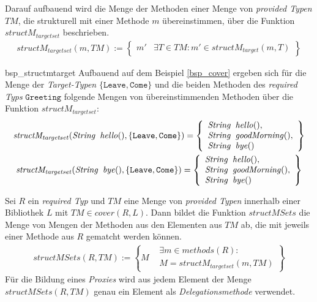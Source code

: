 \noindent
Darauf aufbauend wird die Menge der Methoden einer Menge von \emph{provided Typen} $\mathit{TM}$, die strukturell mit einer Methode $m$ übereinstimmen, über die Funktion $\mathit{structM_{targetset}}$ beschrieben.
\begin{gather*}
\mathit{structM_{targetset}(m, \mathit{TM})} := 
\left\{\begin{array}{l|l}
m'	& \exists T \in \mathit{TM}: m' \in \mathit{structM_{target}(m,T)}
\end{array}
\right\}
\end{gather*}
\begin{example}{bsp_structmtarget}
Aufbauend auf dem Beispiel \ref{bsp_cover} ergeben sich für die Menge der \emph{Target-Typen}  $\{\texttt{Leave}, \texttt{Come}\}$ und die beiden Methoden des \emph{required Typs} $\texttt{Greeting}$ folgende Mengen von übereinstimmenden Methoden über die Funktion $\mathit{structM_{targetset}}$:
\begin{gather*}
\mathit{structM_{targetset}(\mathit{String}\texttt{ }\mathit{hello()},\{\texttt{Leave}, \texttt{Come}\})} = 
\left\{
\begin{array}{l}
\mathit{String}\texttt{ }\mathit{hello()},\\
\mathit{String}\texttt{ }\mathit{goodMorning()},\\
\mathit{String}\texttt{ }\mathit{bye()}
\end{array}
\right\}\\
\mathit{structM_{targetset}(\mathit{String}\texttt{ }\mathit{bye()},\{\texttt{Leave}, \texttt{Come}\})} = 
\left\{
\begin{array}{l}
\mathit{String}\texttt{ }\mathit{hello()},\\
\mathit{String}\texttt{ }\mathit{goodMorning()},\\
\mathit{String}\texttt{ }\mathit{bye()}
\end{array}
\right\}
\end{gather*}
\end{example}
Sei $R$ ein \emph{required Typ} und $\mathit{TM}$ eine Menge von \emph{provided Typen} innerhalb einer Bibliothek $L$ mit $\mathit{TM} \in \mathit{cover(R,L)}$. Dann bildet die Funktion $\mathit{structMSets}$ die Menge von Mengen der Methoden aus den Elementen aus $\mathit{TM}$ ab, die mit jeweils einer Methode aus $R$ gematcht werden können.
\newpage
\begin{gather*}
\mathit{structMSets(R,\mathit{TM})} := 
\left\{M
\begin{array}{l|l}
&\exists \mathit{m} \in \mathit{methods(R)} : 
\\
&M = \mathit{structM_{targetset}(m,\mathit{TM})}
\end{array}
\right\}
\end{gather*}
\noindent
Für die Bildung eines \emph{Proxies} wird aus jedem Element der Menge $structMSets(R,\mathit{TM})$ genau ein Element als \emph{Delegationsmethode} verwendet. 

